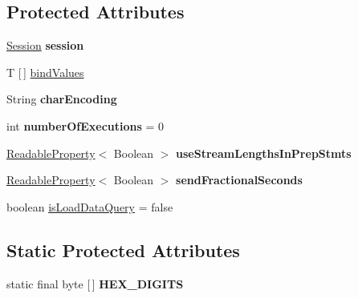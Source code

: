 \subsection*{Protected Attributes}
\begin{DoxyCompactItemize}
\item 
\mbox{\label{classcom_1_1mysql_1_1cj_1_1_abstract_query_bindings_aca9a8e582e3adb2d29ad562aa11bf3b5}} 
\mbox{\hyperlink{interfacecom_1_1mysql_1_1cj_1_1_session}{Session}} {\bfseries session}
\item 
T \mbox{[}$\,$\mbox{]} \mbox{\hyperlink{classcom_1_1mysql_1_1cj_1_1_abstract_query_bindings_a89ff142df297b89a337489fe8f4e0266}{bind\+Values}}
\item 
\mbox{\label{classcom_1_1mysql_1_1cj_1_1_abstract_query_bindings_aa77871b296799261f80d15a47b2b7b28}} 
String {\bfseries char\+Encoding}
\item 
\mbox{\label{classcom_1_1mysql_1_1cj_1_1_abstract_query_bindings_afc729305171e8a1cf48109919d7a7e33}} 
int {\bfseries number\+Of\+Executions} = 0
\item 
\mbox{\label{classcom_1_1mysql_1_1cj_1_1_abstract_query_bindings_ac3e991801df757e24b6885db0c2301d8}} 
\mbox{\hyperlink{interfacecom_1_1mysql_1_1cj_1_1conf_1_1_readable_property}{Readable\+Property}}$<$ Boolean $>$ {\bfseries use\+Stream\+Lengths\+In\+Prep\+Stmts}
\item 
\mbox{\label{classcom_1_1mysql_1_1cj_1_1_abstract_query_bindings_a4470ecf11f0d8b8f3ac3a5f4118f7350}} 
\mbox{\hyperlink{interfacecom_1_1mysql_1_1cj_1_1conf_1_1_readable_property}{Readable\+Property}}$<$ Boolean $>$ {\bfseries send\+Fractional\+Seconds}
\item 
boolean \mbox{\hyperlink{classcom_1_1mysql_1_1cj_1_1_abstract_query_bindings_ae057e7a1b56daa198a730198f3040523}{is\+Load\+Data\+Query}} = false
\end{DoxyCompactItemize}
\subsection*{Static Protected Attributes}
\begin{DoxyCompactItemize}
\item 
static final byte \mbox{[}$\,$\mbox{]} {\bfseries H\+E\+X\+\_\+\+D\+I\+G\+I\+TS}
\end{DoxyCompactItemize}


